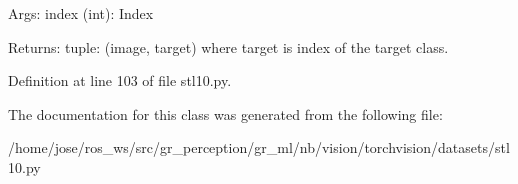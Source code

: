 \begin{DoxyVerb}Args:
    index (int): Index

Returns:
    tuple: (image, target) where target is index of the target class.
\end{DoxyVerb}
 

Definition at line 103 of file stl10.\+py.



The documentation for this class was generated from the following file\+:\begin{DoxyCompactItemize}
\item 
/home/jose/ros\+\_\+ws/src/gr\+\_\+perception/gr\+\_\+ml/nb/vision/torchvision/datasets/stl10.\+py\end{DoxyCompactItemize}
